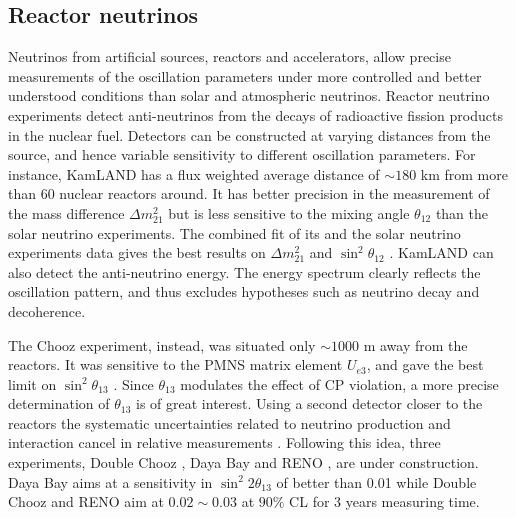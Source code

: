 \subsection{Reactor neutrinos}
\label{sec:reactor}
Neutrinos from artificial sources, reactors and accelerators, allow
precise measurements of the oscillation parameters under more
controlled and better understood conditions than solar and atmospheric
neutrinos. Reactor neutrino experiments detect anti-neutrinos from the
decays of radioactive fission products in the nuclear fuel. Detectors
can be constructed at varying distances from the source, and hence
variable sensitivity to different oscillation parameters. For
instance, KamLAND \cite{Kam03} has a flux weighted average distance of
$\sim180$ km from more than 60 nuclear reactors around. It has better
precision in the measurement of the mass difference $\Delta
m^{2}_{21}$ but is less sensitive to the mixing angle $\theta_{12}$
than the solar neutrino experiments. The combined fit of its and the
solar neutrino experiments data gives the best results on $\Delta
m^{2}_{21}$ and $\sin^{2}\theta_{12}$ \cite{Kam08}. KamLAND can also
detect the anti-neutrino energy. The energy spectrum clearly reflects
the oscillation pattern, and thus excludes hypotheses such as neutrino
decay and decoherence.

The Chooz experiment, instead, was situated only $\sim1000$ m away
from the reactors. It was sensitive to the PMNS matrix element
$U_{e3}$, and gave the best limit on $\sin^{2}\theta_{13}$
\cite{Cho03}. Since $\theta_{13}$ modulates the effect of CP
violation, a more precise determination of $\theta_{13}$ is of great
interest. Using a second detector closer to the reactors the systematic
uncertainties related to neutrino production and interaction cancel in
relative measurements \cite{Koz03}. Following this idea, three
experiments, Double Chooz \cite{Dbc06}, Daya Bay \cite{Day07} and RENO
\cite{Ren08}, are under construction. Daya Bay aims at a sensitivity
in $\sin^{2}2\theta_{13}$ of better than 0.01 while Double Chooz and
RENO aim at $0.02 \sim 0.03$ at $90\%$ CL for 3 years measuring
time.

